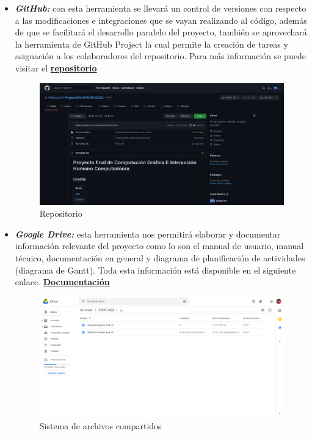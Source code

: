 \documentclass[12pt]{article} %
\begin{document}
	\begin{itemize}
		\item[\textbullet] \emph{\textbf{GitHub:}} con esta herramienta se llevará un control de versiones con respecto a las modificaciones e integraciones que se vayan realizando al código, además de que se facilitará el desarrollo paralelo del proyecto, también se aprovechará la herramienta de GitHub Project la cual permite la creación de tareas y asignación a los colaboradores del repositorio. Para más información se puede visitar el \color{blue}\href{https://github.com/GabooLml/ProyectoFinalCGIHC20222}{\textbf{repositorio}} \color{black}
		\begin{figure}[h]
			\begin{center}
				\includegraphics[scale=0.99]{images/repo.png}
				\caption{Repositorio}
			\end{center}  		
		\end{figure}
		
		\newpage
		\item[\textbullet] \emph{\textbf{Google Drive:}} esta herramienta nos permitirá elaborar y documentar información relevante del proyecto como lo son el manual de usuario, manual técnico, documentación en general y diagrama de planificación de actividades (diagrama de Gantt). Toda esta información está disponible en el siguiente enlace. \color{blue}\href{https://drive.google.com/drive/folders/1gjJ3EJFGPzE9q7rekX6cMGJpEYtjIQUh?usp=sharing}{\textbf{Documentación}} \color{black}
		\begin{figure}[h]
			\begin{center}
				\includegraphics[scale=0.99]{images/drive.png}
				\caption{Sistema de archivos compartidos}
			\end{center}  		
		\end{figure}
	

\end{itemize}
\end{document}
